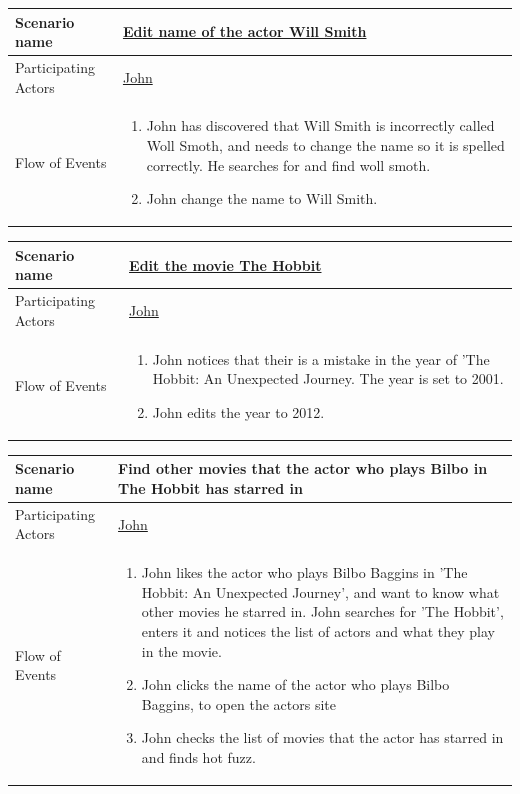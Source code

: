 \begin{center}
	\begin{tabular}{ | l | p{10cm} |  }
		 \hline
		Scenario name & \underline{Edit name of the actor Will Smith}  \\ \hline
		Participating Actors & \underline{John} \\ \hline
		Flow of Events & \begin{enumerate}
						\item John has discovered that Will Smith is incorrectly called Woll Smoth, and needs to change the name so it is spelled correctly. He searches for and find woll smoth.
						\item John change the name to Will Smith.
						\end{enumerate}
						\\ \hline
						
	\end{tabular}
\end{center}

\begin{center}
	\begin{tabular}{ | l | p{10cm} |  }
		 \hline
		Scenario name & \underline{Edit the movie The Hobbit}  \\ \hline
		Participating Actors & \underline{John} \\ \hline
		Flow of Events & \begin{enumerate}
						\item John notices that their is a mistake in the year of 'The Hobbit: An Unexpected Journey. The year is set to 2001.
						\item John edits the year to 2012.
						\end{enumerate}
						\\ \hline
						
	\end{tabular}
\end{center}

\begin{center}
	\begin{tabular}{ | l | p{10cm} |  }
		 \hline
		Scenario name & Find other movies that the actor who plays Bilbo in The Hobbit has starred in  \\ \hline
		Participating Actors & \underline{John} \\ \hline
		Flow of Events & \begin{enumerate}
						\item John likes the actor who plays Bilbo Baggins in 'The Hobbit: An Unexpected Journey', and want to know what other movies he starred in.
						John searches for 'The Hobbit', enters it and notices the list of actors and what they play in the movie.
						\item John clicks the name of the actor who plays Bilbo Baggins, to open the actors site
						\item John checks the list of movies that the actor has starred in and finds hot fuzz.
						\end{enumerate}
						\\ \hline
	\end{tabular}
\end{center}

